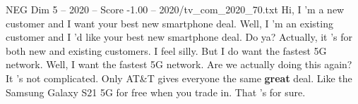 \begin{textsample}{NEG Dim 5 – 2020 – Score -1.00 – 2020/tv\_com\_2020\_70.txt}  \label{ex:f5_neg_066}
Hi, I 'm a new customer and I want your best new smartphone deal.
Well, I 'm an existing customer and I 'd like your best new smartphone deal.
Do ya?
Actually, it 's for both new and existing customers.
I feel silly.
But I do want the fastest 5G network.
Well, I want the fastest 5G network.
Are we actually doing this again?
It 's not complicated.
Only AT\&T gives everyone the same \textbf{great} deal.
Like the Samsung Galaxy S21 5G for free when you trade in.
That 's for sure.

\end{textsample}
